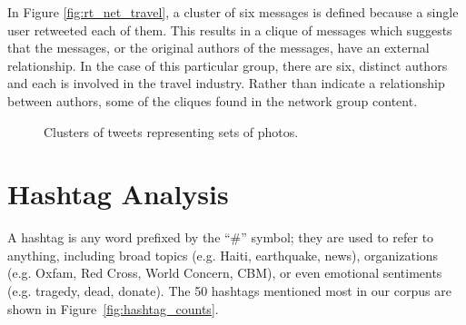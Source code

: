 \documentclass[a4paper, 11pt, titlepage]{article}
\begin{document}
In Figure \ref{fig:rt_net_travel}, a cluster of six messages is defined because a single user retweeted each of them.  This results in a clique of messages which suggests that the messages, or the original authors of the messages, have an external relationship.  In the case of this particular group, there are six, distinct authors and each is involved in the travel industry.  Rather than indicate a relationship between authors, some of the cliques found in the network group content.

\begin{figure}[h!]
\centering
{}
\quad
{}
\caption{Clusters of tweets representing sets of photos.}
\label{fig:rt_net_photos}
\end{figure}

\section{Hashtag Analysis}

A hashtag is any word prefixed by the ``\#'' symbol; they are used to refer to anything, including broad topics (e.g. Haiti, earthquake, news), organizations (e.g. Oxfam, Red Cross, World Concern, CBM), or even emotional sentiments (e.g. tragedy, dead, donate). The 50 hashtags mentioned most in our corpus are shown in Figure~\ref{fig:hashtag_counts}.
\end{document}
